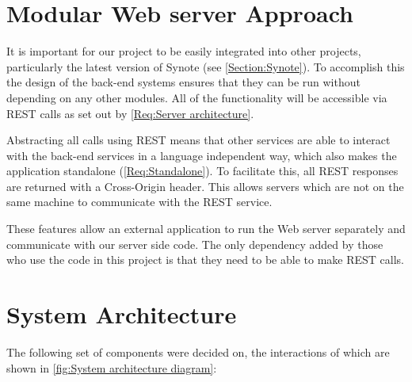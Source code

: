 \section{Modular Web server Approach}
\label{Section:Modular Approach}

It is important for our project to be easily integrated into other projects, particularly the latest version of Synote (see \autoref{Section:Synote}). To accomplish this the design of the back-end systems ensures that they can be run without depending on any other modules. All of the functionality will be accessible via \gls{REST} calls as set out by \cref{Req:Server architecture}.

Abstracting all calls using \gls{REST} means that other services are able to interact with the back-end services in a language independent way, which also makes the application standalone (\cref{Req:Standalone}). To facilitate this, all \gls{REST} responses are returned with a Cross-Origin header. This allows servers which are not on the same machine to communicate with the \gls{REST} service.

These features allow an external application to run the Web server separately and communicate with our server side code. The only dependency added by those who use the code in this project is that they need to be able to make \gls{REST} calls.

\section{System Architecture}

The following set of components were decided on, the interactions of which are shown in \autoref{fig:System architecture diagram}:

